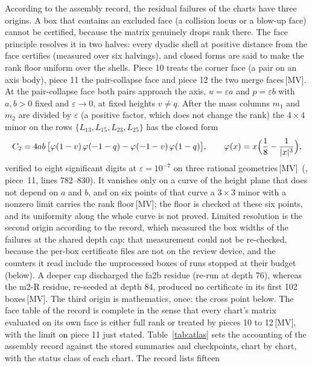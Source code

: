 \documentclass[11pt]{article}
\theoremstyle{definition}
\theoremstyle{remark}
\newcommand{\mk}[1]{\,{\scriptsize[#1]}}
\newcommand{\MV}{\mk{MV}}
\begin{document}
According to the assembly record, the residual failures of the charts have three origins. A box that contains an excluded face (a collision locus or a
blow-up face) cannot be certified, because the matrix genuinely drops rank there. The face principle resolves it
in two halves: every dyadic shell at positive distance from the face certifies (measured over six halvings), and closed
forms are said to make the rank floor uniform over the shells. Piece 10 treats the corner face (a pair on an axis body), piece 11 the
pair-collapse face and piece 12 the two merge faces\MV. At the pair-collapse face both pairs approach the axis,
$u=\varepsilon a$ and $p=\varepsilon b$ with $a,b>0$ fixed and $\varepsilon\to0$, at fixed heights $v\ne q$. After the
mass columns $m_1$ and $m_2$ are divided by $\varepsilon$ (a positive factor, which does not change the rank) the
$4\times4$ minor on the rows $\{L_{13},L_{15},L_{23},L_{25}\}$ has the closed form
\begin{equation}\label{eq:collapse}
C_2=4ab\,\bigl[\varphi(1-v)\,\varphi(-1-q)-\varphi(-1-v)\,\varphi(1-q)\bigr],\qquad
\varphi(x)=x\Bigl(\frac18-\frac1{|x|^3}\Bigr),
\end{equation}
verified to eight significant digits at $\varepsilon=10^{-7}$ on three rational geometries\MV\
(, piece~11, lines 782--830). %
It vanishes only on a curve of the height plane that does not depend on $a$ and $b$, and on six points of that curve a
$3\times3$ minor with a nonzero limit carries the rank floor\MV; the floor is checked at these six points, and its uniformity along the whole curve is not proved. Limited resolution is the second origin according to the record, which measured the box widths of the failures at the shared depth cap; that measurement could not be re-checked, because the per-box
certificate files are not on the review device, and the counters it read include the unprocessed boxes of runs stopped at their budget (below). A deeper cap discharged the fa2b residue (re-run at depth 76), whereas the m2-R residue, re-seeded at depth 84, produced no certificate in its first 102 boxes\MV. The third origin is mathematics,
once: the cross point below. The face table of the record is complete in the sense that every chart's matrix evaluated on its own face is
either full rank or treated by pieces 10 to 12\MV, with the limit on piece 11 just stated.
\label{sec:atlas-status}
Table~\ref{tab:atlas} sets the accounting of the assembly record against the stored summaries and checkpoints, chart by chart, with the status class of each chart. The record lists fifteen
\end{document}
